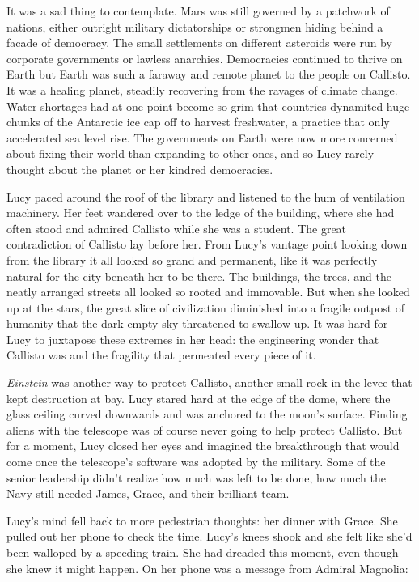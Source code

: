 \documentclass[12pt]{article} %
\begin{document}
It was a sad thing to contemplate. Mars was still governed by a patchwork of nations, either outright military dictatorships or strongmen hiding behind a facade of democracy. The small settlements on different asteroids were run by corporate governments or lawless anarchies. Democracies continued to thrive on Earth but Earth was such a faraway and remote planet to the people on Callisto. It was a healing planet, steadily recovering from the ravages of climate change. Water shortages had at one point become so grim that countries dynamited huge chunks of the Antarctic ice cap off to harvest freshwater, a practice that only accelerated sea level rise. The governments on Earth were now more concerned about fixing their world than expanding to other ones, and so Lucy rarely thought about the planet or her kindred democracies. 

Lucy paced around the roof of the library and listened to the hum of ventilation machinery. Her feet wandered over to the ledge of the building, where she had often stood and admired Callisto while she was a student. The great contradiction of Callisto lay before her. From Lucy's vantage point looking down from the library it all looked so grand and permanent, like it was perfectly natural for the city beneath her to be there. The buildings, the trees, and the neatly arranged streets all looked so rooted and immovable. But when she looked up at the stars, the great slice of civilization diminished into a fragile outpost of humanity that the dark empty sky threatened to swallow up. It was hard for Lucy to juxtapose these extremes in her head: the engineering wonder that Callisto was and the fragility that permeated every piece of it.

\textit{Einstein} was another way to protect Callisto, another small rock in the levee that kept destruction at bay. Lucy stared hard at the edge of the dome, where the glass ceiling curved downwards and was anchored to the moon's surface. Finding aliens with the telescope was of course never going to help protect Callisto. But for a moment, Lucy closed her eyes and imagined the breakthrough that would come once the telescope's software was adopted by the military. Some of the senior leadership didn't realize how much was left to be done, how much the Navy still needed James, Grace, and their brilliant team. 

Lucy's mind fell back to more pedestrian thoughts: her dinner with Grace. She pulled out her phone to check the time. Lucy's knees shook and she felt like she'd been walloped by a speeding train. She had dreaded this moment, even though she knew it might happen. On her phone was a message from Admiral Magnolia:
\end{document}
